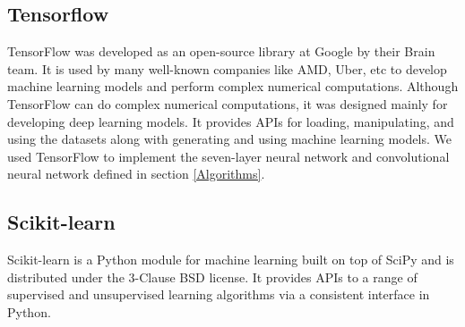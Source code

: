\subsection{Tensorflow}
TensorFlow was developed as an open-source library at Google by their Brain team. It is used by many well-known companies like AMD, Uber, etc to develop machine learning models and perform complex numerical computations. Although TensorFlow can do complex numerical computations, it was designed mainly for developing deep learning models. It provides APIs for loading, manipulating, and using the datasets along with generating and using machine learning models. We used TensorFlow to implement the seven-layer neural network and convolutional neural network defined in section \ref{Algorithms}.


\subsection{Scikit-learn}
Scikit-learn is a Python module for machine learning built on top of SciPy and is distributed under the 3-Clause BSD license.
It provides APIs to a range of supervised and unsupervised learning algorithms via a consistent interface in Python.












